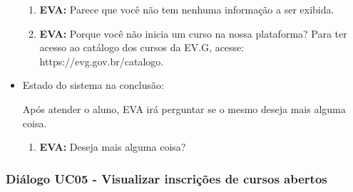 \begin{itemize}
        \begin{enumerate}
            \item \textbf{EVA:} Parece que você não tem nenhuma informação a ser exibida.
            \item \textbf{EVA:} Porque você não inicia um curso na nossa plataforma? Para ter acesso ao catálogo dos cursos da EV.G, acesse: https://evg.gov.br/catalogo.
        \end{enumerate}
    
    \item Estado do sistema na conclusão:
    
        Após atender o aluno, EVA irá perguntar se o mesmo deseja mais alguma coisa.
        
        \begin{enumerate}
            \item \textbf{EVA:} Deseja mais alguma coisa?
        \end{enumerate}
\end{itemize}


\subsubsection{Diálogo UC05 - Visualizar inscrições de cursos abertos}

